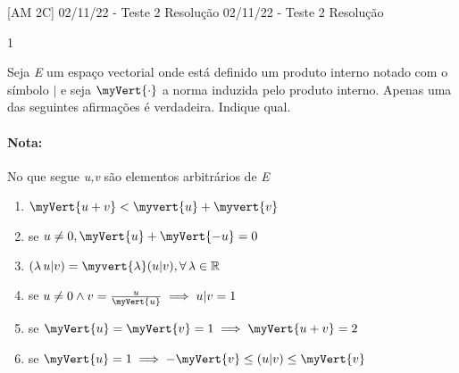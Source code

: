 \documentclass[\mainfilename]{subfiles}
\begin{document}

[AM 2C]
{02/11/22 - Teste 2 Resolução} %
{02/11/22 - Teste 2 Resolução} %

\group{}

\begin{questionBox}1{ %
    Seja \textit{E} um espaço vectorial onde está definido um produto interno notado com o símbolo \(\vert\) e seja \(\myVert{\cdot}\) a norma induzida pelo produto interno. Apenas uma das seguintes afirmações é verdadeira. Indique qual.
    \paragraph*{Nota: }  No que segue \textit{u,v} são elementos arbitrários de \textit{E}
} %
    \begin{enumerate}
        \item \(\myVert{u+v}<\myvert{u}+\myvert{v}\)
        \item se \(
            u\neq0
            ,\myVert{u}+\myVert{-u}=0
        \)
        \item \(
            (\lambda\,u\vert v)=\myvert{\lambda}(u\vert v)
            ,\forall\,\lambda\in\mathbb{R}
        \)
        \item se \(
            u\neq0\land v=\frac{u}{\myVert{u}}
            \implies u\vert v=1
        \)
        \item se \(
            \myVert{u}=\myVert{v}=1
            \implies \myVert{u+v}=2
        \)
        \item se \(
            \myVert{u}=1
            \implies-\myVert{v}\leq(u\vert v)\leq\myVert{v}
        \)
    \end{enumerate}
    \answer{}
\end{questionBox}

\group{}
\end{document}
